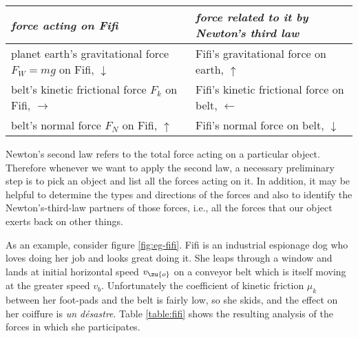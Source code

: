 \begin{timetravel}
\begin{table*}
\begin{tabular}{|p{52mm}|p{52mm}|}
\hline
\emph{force acting on Fifi}  &   \emph{force related to it by Newton's third law} \\
\hline
planet earth's gravitational force $F_W=mg$ on Fifi, \hfill $\downarrow$  &  Fifi's gravitational force on earth, \hfill $\uparrow$\\
\hline
belt's kinetic frictional force $F_k$ on Fifi, \hfill $\rightarrow$  &  Fifi's kinetic frictional force on belt, \hfill $\leftarrow$\\
\hline
belt's normal force $F_N$ on Fifi, \hfill $\uparrow$  &  Fifi's normal force on belt, \hfill $\downarrow$\\
\hline
\end{tabular}
\caption{Analysis of the forces on the dog.}\label{table:fifi}
\end{table*}
\end{timetravel}

Newton's second law refers to the total force acting on a particular object.
Therefore whenever we want to apply the second law, a necessary preliminary
step is to pick an object and list all the forces acting on it. In addition,
it may be helpful to determine the types and directions of the forces
and also to identify the Newton's-third-law partners of those forces,
i.e., all the forces that our object exerts back on other things.


As an example, consider figure \ref{fig:eg-fifi}. 
Fifi is an industrial espionage dog who loves doing her job and looks great doing it.
She leaps through a window and lands at initial horizontal speed $v_\zu{o}$ on a conveyor belt which is itself
moving at the greater speed $v_b$. Unfortunately the coefficient of kinetic friction $\mu_k$ between her foot-pads
and the belt is fairly low, so she skids, and the effect on her coiffure is \emph{un d\'{e}sastre}.
Table \ref{table:fifi} shows the resulting analysis of the forces in which she participates.
